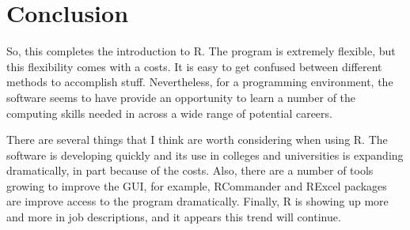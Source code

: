 \documentclass{tufte-handout}\usepackage[]{graphicx}\usepackage[]{color}
\begin{document}
\section{Conclusion}
So, this completes the introduction to R. The program is extremely flexible, but this flexibility comes with a costs. It is easy to get confused between different methods to accomplish stuff. Nevertheless, for a programming environment, the software seems to have provide an opportunity to learn a number of the computing skills needed in across a wide range of potential careers. 

There are several things that I think are worth considering when using R. The software is developing quickly and its use in colleges and universities is expanding dramatically, in part because of the costs. Also, there are a number of tools growing to improve the GUI, for example, RCommander and RExcel packages are improve access to the program dramatically. Finally, R is showing up more and more in job descriptions, and it appears this trend will continue. 
\clearpage

\FloatBarrier 
\begin{fullwidth}


\end{fullwidth}
\end{document}
